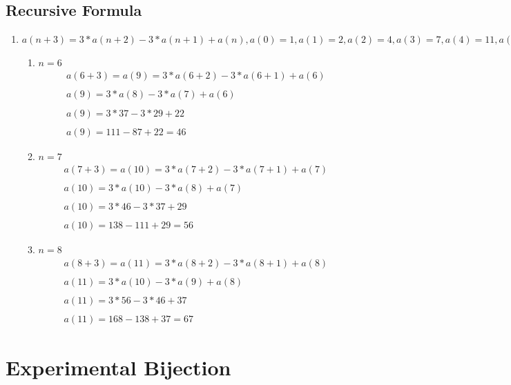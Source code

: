 \documentclass[a4paper,10pt]{article}
\begin{document}
\subsection{Recursive Formula}
\begin{enumerate}
\item $ a(n+3) = 3*a(n+2)-3*a(n+1) + a(n), a(0) = 1, a(1) = 2, a(2) = 4, a(3) = 7, a(4) = 11, a(5) = 16, a(6) = 22, a(7) = 29, a(8) = 37 $
	\begin{enumerate}
		\item $n = 6$
		\[
		\boxed{
			\begin{gathered}
				a(6+3) = a(9) = 3*a(6+2) - 3*a(6+1) + a(6)\\
				\\
				a(9) = 3*a(8) - 3*a(7) + a(6)\\
				\\
				a(9) = 3*37 - 3*29 + 22\\
				\\
				a(9) = 111-87+22 = 46
			\end{gathered}
			}
		\]
		
		\item $n = 7$
		\[
		\boxed{
			\begin{gathered}
				a(7+3) = a(10) = 3*a(7+2) - 3*a(7+1) + a(7)\\
				\\
				a(10) = 3*a(10) - 3*a(8) + a(7)\\
				\\
				a(10) = 3*46 - 3*37 + 29\\
				\\
				a(10) = 138-111+29 = 56
			\end{gathered}
			}
		\]
		
		\item $n = 8$
		\[
		\boxed{
			\begin{gathered}
				a(8+3) = a(11) = 3*a(8+2) - 3*a(8+1) + a(8)\\
				\\
				a(11) = 3*a(10) - 3*a(9) + a(8)\\
				\\
				a(11) = 3*56 - 3*46 + 37\\
				\\
				a(11) = 168-138+37 = 67
			\end{gathered}
			}
		\]
	\end{enumerate}

\end{enumerate}

\section{Experimental Bijection}
\end{document}
